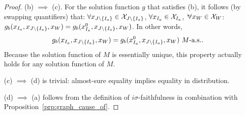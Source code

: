 \begin{proof}
  (b) $\implies$ (c).
  For the solution function $g$ that satisfies (b), it follows (by swapping quantifiers) that:
  $\forall x_{J\setminus\{I_a\}} \in \mathcal{X}_{J\setminus\{I_a\}}$, $\forall x_{I_a} \in \mathcal{X}_{I_a}$, $\foralmostall x_W \in \CX_W$: $g_b(x_{I_a},x_{J\setminus\{I_a\}},x_W) = g_b(x_{I_a}^0,x_{J\setminus\{I_a\}},x_W)$.
  In other words,
  $$g_b(x_{I_a},x_{J\setminus\{I_a\}},x_W) = g_b(x_{I_a}^0,x_{J\setminus\{I_a\}},x_W)\ M\text{-a.s.}.$$
  Because the solution function of $M$ is essentially unique, this property actually holds for any solution function of $M$.

  (c) $\implies$ (d) is trivial: almost-sure equality implies equality in distribution.
  
  (d) $\implies$ (a) follows from the definition of $i\sigma$-faithfulness in combination with Proposition~\ref{prp:graph_cause_of}.
\end{proof}


